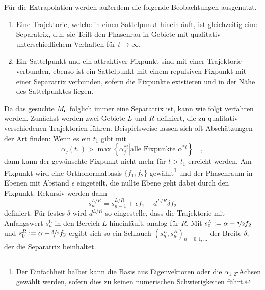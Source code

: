     Für die Extrapolation werden außerdem die folgende Beobachtungen ausgenutzt.
    \begin{enumerate}
     \item Eine Trajektorie, welche in einen Sattelpunkt hineinläuft, ist 
     gleichzeitig eine Separatrix, d.h. sie Teilt den Phasenrau in Gebiete mit 
     qualitativ unterschiedlichem  Verhalten für $t \to \infty$.
     \item Ein Sattelpunkt und ein attraktiver Fixpunkt sind mit einer 
     Trajektorie verbunden, ebenso ist ein Sattelpunkt mit einem repulsiven 
     Fixpunkt mit einer Separatrix verbunden, sofern die Fixpunkte existieren 
     und in der Nähe des Sattelpunktes liegen. 
    \end{enumerate}

    Da das gesuchte $M_\text{c}$ folglich immer eine Separatrix ist, kann wie folgt 
    verfahren werden. Zunächst werden zwei Gebiete $L$ und $R$ definiert, die 
    zu qualitativ verschiedenen Trajektorien führen. Beispielsweise lassen sich 
    oft Abschätzungen der Art finden: Wenn es 
    ein $t_1$ gibt mit
    \begin{equation}
     \alpha_j(t_1) > \max \left\{ \left. \alpha^{*i}_j \right|\text{alle 
     Fixpunkte } 
     \alpha^{*i}\right\} \quad ,
    \end{equation}
    dann kann der gewünschte Fixpunkt nicht mehr für $t>t_1$ erreicht werden.
    Am Fixpunkt wird eine Orthonormalbasis $\{f_1,f_2\}$ gewählt\footnote{Der 
    Einfachheit halber kann die Basis aus Eigenvektoren oder die 
    $\alpha_{1,2}$-Achsen gewählt werden, sofern dies 
    zu keinen numerischen Schwierigkeiten führt.}
    und der Phasenraum in Ebenen mit Abstand $\epsilon$ 
    eingeteilt, die nullte Ebene geht dabei durch den Fixpunkt. Rekursiv werden 
    dann
    \begin{equation}
     s^{L/R}_n = s^{L/R}_{n-1} + \epsilon f_1 + d^{L/R} \delta f_2 
    \end{equation}
    definiert. Für festes $\delta$ wird $d^{L/R}$ so eingestelle, dass die 
    Trajektorie 
    mit Anfangswert $s^\text{L}_n$ in den Bereich $L$ hineinläuft, analog für 
    $R$. 
    Mit $s^L_0:=\alpha-\nicefrac{\delta}{2}  f_2$ und 
    $s^R_0:=\alpha+\nicefrac{\delta}{2} f_2$ 
    ergibt sich so ein Schlauch $\left(s^{L}_n,s^R_n \right)_{n=0,1,\ldots}$ 
    der Breite 
    $\delta$, der die Separatrix beinhaltet.

    